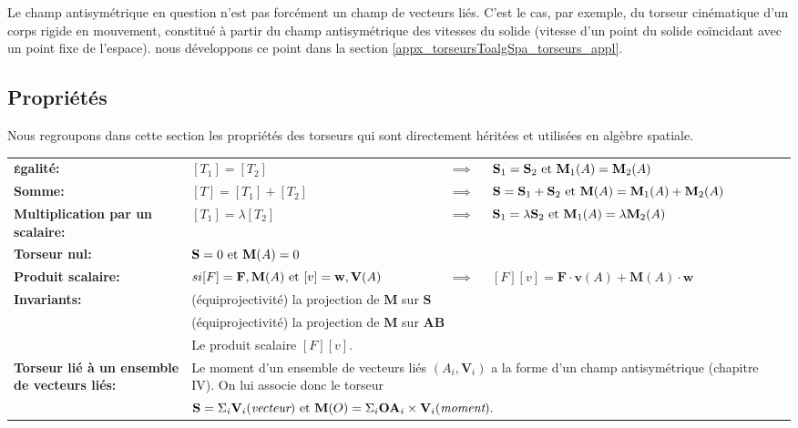 Le champ antisymétrique en question n'est pas forcément un champ de vecteurs liés. C'est le cas, par exemple, du torseur cinématique d'un corps rigide en mouvement, constitué à partir du champ antisymétrique des vitesses du solide (vitesse d'un point du solide coïncidant avec un point fixe de l'espace). nous développons ce point dans la section \ref{appx_torseursToalgSpa_torseurs_appl}.

\subsection{Propriétés} \label{appx_torseursToalgSpa_torseurs_prop}

Nous regroupons dans cette section les propriétés des torseurs qui sont directement héritées et utilisées en algèbre spatiale.


\begin{flushleft}
\begin{tabular}{ l l c p{5cm} }
  \textbf{\textsc{é}galité:}
  & $[T_{1}]=[T_{2}]$ & $\implies$ & $\mathbf{S}_{1}=\mathbf{S}_{2} \textnormal{ et } \mathbf{M}_{1}(A)=\mathbf{M}_{2}(A)$ \\
  \textbf{Somme:}
  & $[T]=[T_{1}]+[T_{2}]$ & $\implies$ & $\mathbf{S}=\mathbf{S}_{1}+\mathbf{S}_{2} \textnormal{ et } \mathbf{M}(A)=\mathbf{M}_{1}(A)+\mathbf{M}_{2}(A)$ \\
  \textbf{Multiplication par un scalaire:}
  & $[T_{1}]=\lambda [T_{2}]$ & $\implies$ & $\mathbf{S}_{1}=\lambda \mathbf{S}_{2} \textnormal{ et } \mathbf{M}_{1}(A)=\lambda \mathbf{M}_{2}(A)$ \\
  \textbf{Torseur nul:}
  & \multicolumn{3}{l}{$\mathbf{S}=0 \textnormal{ et } \mathbf{M}(A)=0$} \\
  \textbf{Produit scalaire:}
  & $si [F]={\mathbf{F},\mathbf{M}(A)} \textnormal{ et } [v]={\mathbf{w},\mathbf{V}(A)}$ & $\implies$ & $[F][v] = \mathbf{F} \cdot \mathbf{v}(A) + \mathbf{M}(A) \cdot \mathbf{w}$ \\
  \textbf{Invariants:}
  & \multicolumn{3}{l}{(équiprojectivité) la projection de $\mathbf{M}$ sur $\mathbf{S}$} \\
  & \multicolumn{3}{l}{(équiprojectivité) la projection de $\mathbf{M}$ sur $\mathbf{AB}$} \\
  & \multicolumn{3}{l}{Le produit scalaire $[F][v]$.} \\
  \multicolumn{1}{p{6cm}}{\textbf{Torseur lié à un ensemble de vecteurs liés:}}
  & \multicolumn{3}{p{10cm}}{Le moment d'un ensemble de vecteurs liés ${(A_{i},\mathbf{V}_{i})}$ a la forme d'un champ antisymétrique \cite{bib_champVecteurs} (chapitre IV). On lui associe donc
  le torseur} \\
  & \multicolumn{3}{l}{$\mathbf{S}=\Sigma_{i}\mathbf{V}_{i} (\emph{vecteur}) \textnormal{ et } \mathbf{M}(O)=\Sigma_{i}\mathbf{OA}_{i} \times \mathbf{V}_{i} (\emph{moment}).$} \\
\end{tabular}
\end{flushleft}

